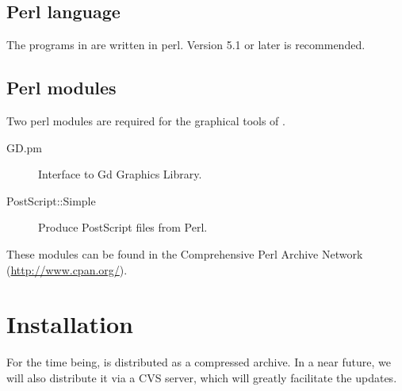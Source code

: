 \documentclass{article}
\begin{document}
\subsection{Perl language}

The programs in \RSAT are written in perl. Version 5.1 or
later is recommended.

\subsection{Perl modules}

Two perl modules are required for the graphical tools of \RSAT.

\begin{description}
\item[GD.pm] Interface to Gd Graphics Library.
\item[PostScript::Simple]  Produce PostScript files from Perl.
\end{description}

These modules can be found in the Comprehensive Perl Archive Network
(\url{http://www.cpan.org/}).


\section{Installation}

For the time being, \RSAT is distributed as a compressed archive. In a
near future, we will also distribute it via a CVS server, which will
greatly facilitate the updates.






\end{document}
